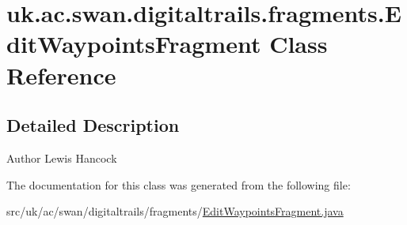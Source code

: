 \hypertarget{classuk_1_1ac_1_1swan_1_1digitaltrails_1_1fragments_1_1_edit_waypoints_fragment}{\section{uk.\+ac.\+swan.\+digitaltrails.\+fragments.\+Edit\+Waypoints\+Fragment Class Reference}
\label{classuk_1_1ac_1_1swan_1_1digitaltrails_1_1fragments_1_1_edit_waypoints_fragment}
}


\subsection{Detailed Description}
\begin{DoxyAuthor}{Author}
Lewis Hancock 
\end{DoxyAuthor}


The documentation for this class was generated from the following file\+:\begin{DoxyCompactItemize}
\item 
src/uk/ac/swan/digitaltrails/fragments/\hyperlink{_edit_waypoints_fragment_8java}{Edit\+Waypoints\+Fragment.\+java}\end{DoxyCompactItemize}
